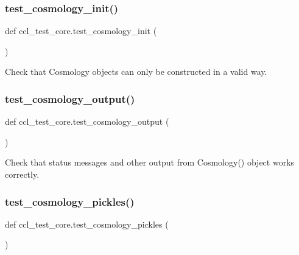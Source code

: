 \subsubsection{\texorpdfstring{test\+\_\+cosmology\+\_\+init()}{test\_cosmology\_init()}}
{\footnotesize\ttfamily def ccl\+\_\+test\+\_\+core.\+test\+\_\+cosmology\+\_\+init (\begin{DoxyParamCaption}{ }\end{DoxyParamCaption})}

\begin{DoxyVerb}Check that Cosmology objects can only be constructed in a valid way.
\end{DoxyVerb}
 \mbox{\label{namespaceccl__test__core_a7086ffc367c4c602cd12e67b76209a44}} 
\subsubsection{\texorpdfstring{test\+\_\+cosmology\+\_\+output()}{test\_cosmology\_output()}}
{\footnotesize\ttfamily def ccl\+\_\+test\+\_\+core.\+test\+\_\+cosmology\+\_\+output (\begin{DoxyParamCaption}{ }\end{DoxyParamCaption})}

\begin{DoxyVerb}Check that status messages and other output from Cosmology() object works
correctly.
\end{DoxyVerb}
 \mbox{\label{namespaceccl__test__core_a6eb4932e1d1d3b5ba670e92cb7380254}} 
\subsubsection{\texorpdfstring{test\+\_\+cosmology\+\_\+pickles()}{test\_cosmology\_pickles()}}
{\footnotesize\ttfamily def ccl\+\_\+test\+\_\+core.\+test\+\_\+cosmology\+\_\+pickles (\begin{DoxyParamCaption}{ }\end{DoxyParamCaption})}

